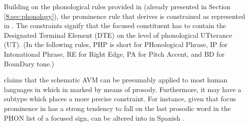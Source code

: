 Building on the phonological rules provided in
 (already presented in
Section \ref{8:sec:phonology}), the  prominence rule
that \citet{bildhauer:07} derives is constrained as represented in
. The constraints signify that the
focused constituent has to contain the Designated Terminal Element
(DTE) on the level of phonological UTterance (UT). (In the following
rules, PHP is short for PHonological Phrase, IP for Intonational
Phrase, RE for Right Edge, PA for Pitch Accent, and BD for BounDary
tone.)







\noindent \citeauthor{bildhauer:07} claims that the schematic AVM
 can be presumably applied to
most human languages in which  in marked by means of prosody.
Furthermore, it may have a subtype which places a more precise
constraint. For instance, given that focus
prominence in  has a strong tendency to fall on the last
prosodic word in the PHON list of a focused sign,
 can be altered into
 in Spanish \citep[191]{bildhauer:07}.



